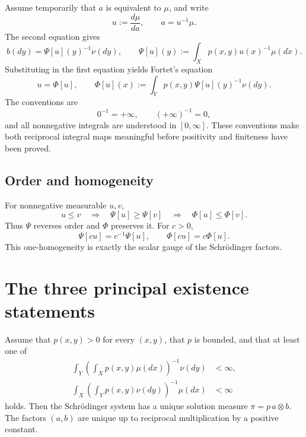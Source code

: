 Assume temporarily that $a$ is equivalent to $\mu$, and write
\[
 u:=\frac{d\mu}{da},\qquad a=u^{-1}\mu.
\]
The second equation gives
\[
 b(dy)=\Psi[u](y)^{-1}\nu(dy),
 \qquad
 \Psi[u](y):=\int_Xp(x,y)u(x)^{-1}\mu(dx).
\]
Substituting in the first equation yields Fortet's equation
\begin{equation}\label{eq:L19-fortet}
 u=\Phi[u],
 \qquad
 \Phi[u](x):=\int_Yp(x,y)\Psi[u](y)^{-1}\nu(dy).
\end{equation}
The conventions are
\[
 0^{-1}=+\infty,
 \qquad
 (+\infty)^{-1}=0,
\]
and all nonnegative integrals are understood in $[0,\infty]$.  These conventions make both reciprocal integral maps meaningful before positivity and finiteness have been proved.

\subsection{Order and homogeneity}
For nonnegative measurable $u,v$,
\begin{equation}\label{eq:L19-order}
 u\le v\quad\Longrightarrow\quad
 \Psi[u]\ge\Psi[v]
 \quad\Longrightarrow\quad
 \Phi[u]\le\Phi[v].
\end{equation}
Thus $\Psi$ reverses order and $\Phi$ preserves it.  For $c>0$,
\begin{equation}\label{eq:L19-homogeneity}
 \Psi[cu]=c^{-1}\Psi[u],
 \qquad
 \Phi[cu]=c\Phi[u].
\end{equation}
This one-homogeneity is exactly the scalar gauge of the Schr\"odinger factors.

\section{The three principal existence statements}

\begin{theorem}\label{thm:L19-main-integral}
Assume that $p(x,y)>0$ for every $(x,y)$, that $p$ is bounded, and that at least one of
\begin{align}
 \int_Y\left(\int_Xp(x,y)\mu(dx)\right)^{-1}\nu(dy)&<\infty,\label{eq:L19-int-x}\\
 \int_X\left(\int_Yp(x,y)\nu(dy)\right)^{-1}\mu(dx)&<\infty\label{eq:L19-int-y}
\end{align}
holds.  Then the Schr\"odinger system has a unique solution measure $\pi=p\,a\otimes b$.  The factors $(a,b)$ are unique up to reciprocal multiplication by a positive constant.
\end{theorem}

